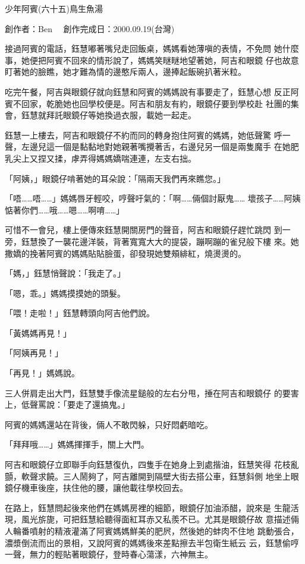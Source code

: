 



少年阿賓(六十五)鳥生魚湯

創作者：Ben　
創作完成日：2000.09.19(台灣)


接過阿賓的電話，鈺慧嘟著嘴兒走回飯桌，媽媽看她薄嗔的表情，不免問
她什麼事，她便把阿賓不回來的情形說了，媽媽笑瞇瞇地望著她，阿吉和眼鏡
仔也故意盯著她的臉瞧，她才難為情的邊憨斥兩人，邊捧起飯碗扒著米粒。

吃完午餐，阿吉與眼鏡仔就向鈺慧和阿賓的媽媽說有事要走了，鈺慧心想
反正阿賓不回家，乾脆她也回學校便是。阿吉和朋友有約，眼鏡仔要到學校赴
社團的集會，鈺慧就拜託眼鏡仔等她換過衣服，載她一起走。

鈺慧一上樓去，阿吉和眼鏡仔不約而同的轉身抱住阿賓的媽媽，她低聲驚
呼一聲，左邊兒這一個是黏黏地對她親著嘴攪著舌，右邊兒另一個是兩隻魔手
在她肥乳尖上又捏又揉，虖弄得媽媽嬌喘連連，左支右拙。

「阿姨，」眼鏡仔啃著她的耳朵說：「隔兩天我們再來瞧您。」

「唔……唔……」媽媽唇牙輕咬，哼聲吁氣的：「啊……倆個討厭鬼……
壞孩子……阿姨惦著你們……哦……嗯……啊唷……」

可惜不一會兒，樓上便傳來鈺慧開關房門的聲音，阿吉和眼鏡仔趕忙跳閃
到一旁，鈺慧換了一襲花邊洋裝，背著寬寬大大的提袋，蹦啊蹦的雀兒般下樓
來。她撒嬌的挽著阿賓的媽媽貼貼臉蛋，卻發現她雙頰緋紅，燒燙燙的。

「媽，」鈺慧悄聲說：「我走了。」

「嗯，乖。」媽媽摸摸她的頭髮。

「喂！走啦！」鈺慧轉頭向阿吉他們說。

「黃媽媽再見！」

「阿姨再見！」

「再見！」媽媽說。

三人併肩走出大門，鈺慧雙手像流星鎚般的左右分甩，捶在阿吉和眼鏡仔
的要害上，低聲罵說：「要走了還搞鬼。」

阿賓的媽媽還站在背後，倆人不敢閃躲，只好悶虧暗吃。

「拜拜哦……」媽媽揮揮手，關上大門。

阿吉和眼鏡仔立即聯手向鈺慧復仇，四隻手在她身上到處揩油，鈺慧笑得
花枝亂顫，軟聲求饒。三人鬧夠了，阿吉離開到隔壁大街去搭公車，鈺慧斜側
地坐上眼鏡仔機車後座，扶住他的腰，讓他載往學校回去。

在路上，鈺慧問起後來他們在媽媽房裡的細節，眼鏡仔加油添醋，說來是
生龍活現，風光旂旎，可把鈺慧給聽得面紅耳赤又私羨不已。尤其是眼鏡仔故
意描述倆人輪番噴射的精液灌滿了阿賓媽媽鮮美的肥屄，然後她的蚌肉不住地
跳動張合，濃漿倒流而出的景相，又說阿賓的媽媽後來差點擦去半包衛生紙云
云，鈺慧偷哼一聲，無力的輕貼著眼鏡仔，登時春心蕩漾，六神無主。

